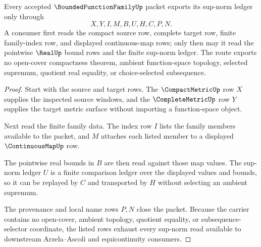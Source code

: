 \begin{theorem}
\label{thm:bounded-function-family-sup-norm-route}
Every accepted $\BoundedFunctionFamilyUp$ packet exports its sup-norm ledger only through
$$
X,Y,I,M,B,U,H,C,P,N.
$$
A consumer first reads the compact source row, complete target row, finite family-index row, and displayed continuous-map rows; only then may it read the pointwise $\RealUp$ bound rows and the finite sup-norm ledger. The route exports no open-cover compactness theorem, ambient function-space topology, selected supremum, quotient real equality, or choice-selected subsequence.
\end{theorem}
\begin{proof}
Start with the source and target rows. The $\CompactMetricUp$ row $X$ supplies the inspected source windows, and the $\CompleteMetricUp$ row $Y$ supplies the target metric surface without importing a function-space object.

Next read the finite family data. The index row $I$ lists the family members available to the packet, and $M$ attaches each listed member to a displayed $\ContinuousMapUp$ row.

The pointwise real bounds in $B$ are then read against those map values. The sup-norm ledger $U$ is a finite comparison ledger over the displayed values and bounds, so it can be replayed by $C$ and transported by $H$ without selecting an ambient supremum.

The provenance and local name rows $P,N$ close the packet. Because the carrier contains no open-cover, ambient topology, quotient equality, or subsequence-selector coordinate, the listed rows exhaust every sup-norm read available to downstream Arzela--Ascoli and equicontinuity consumers.
\end{proof}

